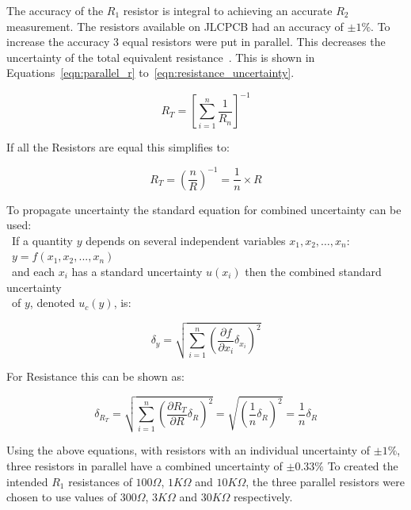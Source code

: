 The accuracy of the $R_1$ resistor is integral to achieving an accurate $R_2$ measurement.
The resistors available on JLCPCB had an accuracy of $\pm{1}\%$.
To increase the accuracy 3 equal resistors were put in parallel. This decreases the uncertainty of the total equivalent resistance~\cite{cam_clark}.
This is shown in Equations~\ref{eqn:parallel_r} to~\ref{eqn:resistance_uncertainty}.

\begin{equation}\label{eqn:parallel_r}
    R_{T} = {\left[{\sum_{i=1}^{n}{\frac{1}{R_n}}}\right]}^{-1}
\end{equation}

If all the Resistors are equal this simplifies to: 

\begin{equation}\label{eqn:parallel_r_equal}
    R_{T} = ({\frac{n}{R}})^{-1} = \frac{1}{n} \times R
\end{equation}

To propagate uncertainty the standard equation for combined uncertainty can be used: \\
\hspace*{2em}~If a quantity $y$ depends on several independent variables $x_1, x_2, \ldots, x_n$: \\
\hspace*{2em}~$y=f(x_1, x_2, ..., x_n)$ \\
\hspace*{2em}~and each $x_i$ has a standard uncertainty $u(x_i)$ then the combined standard uncertainty \\
\hspace*{2em}~of $y$, denoted $u_c(y)$, is:

\begin{equation}\label{eqn:standard_uncertainty}
    \delta_y=\sqrt{\sum_{i=1}^{n}{\left({{\frac{\partial{f}}{\partial{x_i}}}{\delta_{x_i}}}\right)}^2}
\end{equation}

For Resistance this can be shown as:

\begin{equation}\label{eqn:resistance_uncertainty}
    \delta_{R_T}=\sqrt{\sum_{i=1}^{n}{\left({{\frac{\partial{R_{T}}}{\partial{R}}}{\delta_{R}}}\right)}^2} = \sqrt{{\left({{\frac{1}{n}}\delta_R}\right)}^2} = \frac{1}{n}\delta_R
\end{equation}

Using the above equations, with resistors with an individual uncertainty of $\pm1\%$, three resistors in parallel have a combined uncertainty of $\pm0.33\%$
To created the intended $R_1$ resistances of $100\Omega$, $1K\Omega$ and $10K\Omega$, the three parallel resistors were chosen to use values of $300\Omega$, $3K\Omega$ and $30K\Omega$ respectively.

